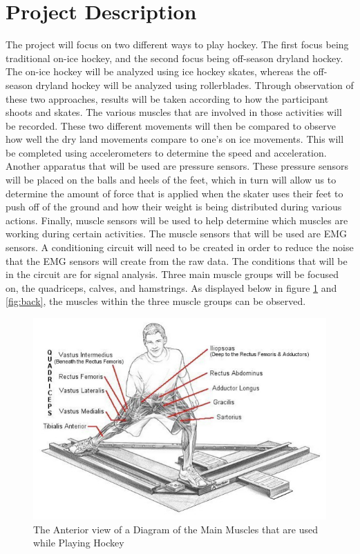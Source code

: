 \section{Project Description}
The project will focus on two different ways to play hockey. The first focus being traditional on-ice hockey, and the second focus being off-season dryland hockey. The on-ice hockey will be analyzed using ice hockey skates, whereas the off-season dryland hockey will be analyzed using rollerblades. Through observation of these two approaches, results will be taken according to how the participant shoots and skates. The various muscles that are involved in those activities will be recorded. These two different movements will then be compared to observe how well the dry land movements compare to one’s on ice movements. This will be completed using accelerometers to determine the speed and acceleration. Another apparatus that will be used are pressure sensors. These pressure sensors will be placed on the balls  and heels of the feet, which in turn will allow us to determine the amount of force that is applied when the skater uses their feet to push off of the ground and how their weight is being distributed during various actions. Finally, muscle sensors will be used to help determine which muscles are working during certain activities. The muscle sensors that will be used are EMG sensors. A conditioning circuit will need to be created in order to reduce the noise that the EMG sensors will create from the raw data. The conditions that will be in the circuit are for signal analysis.  Three main muscle groups will be focused on, the quadriceps, calves, and hamstrings. As displayed below in figure \ref{fig:front} and \ref{fig:back}, the muscles within the three muscle groups can be observed.
\begin{figure}[htbp]
\centering
\includegraphics[scale=0.4]{Project_Proposal/figs/blog-muscles-used-for-skating-the-skating-anatomy-01.jpg}
\caption{The Anterior view of a Diagram of the Main Muscles that are 
used while Playing Hockey\cite{6}}
\label{fig:front}
\end{figure}

